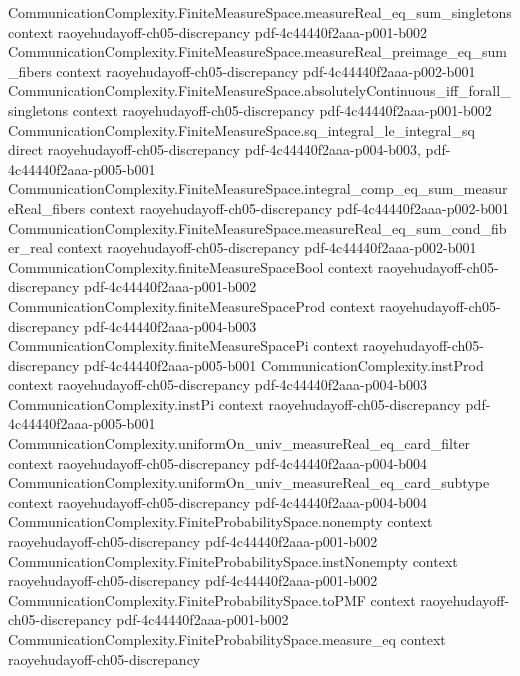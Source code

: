 \begin{theorem}
\proofstep
  {CommunicationComplexity.FiniteMeasureSpace.measureReal_eq_sum_singletons}
  {context}
  {raoyehudayoff-ch05-discrepancy}
  {pdf-4c44440f2aaa-p001-b002}
\proofstep
  {CommunicationComplexity.FiniteMeasureSpace.measureReal_preimage_eq_sum_fibers}
  {context}
  {raoyehudayoff-ch05-discrepancy}
  {pdf-4c44440f2aaa-p002-b001}
\proofstep
  {CommunicationComplexity.FiniteMeasureSpace.absolutelyContinuous_iff_forall_singletons}
  {context}
  {raoyehudayoff-ch05-discrepancy}
  {pdf-4c44440f2aaa-p001-b002}
\proofstep
  {CommunicationComplexity.FiniteMeasureSpace.sq_integral_le_integral_sq}
  {direct}
  {raoyehudayoff-ch05-discrepancy}
  {pdf-4c44440f2aaa-p004-b003,
    pdf-4c44440f2aaa-p005-b001}
\proofstep
  {CommunicationComplexity.FiniteMeasureSpace.integral_comp_eq_sum_measureReal_fibers}
  {context}
  {raoyehudayoff-ch05-discrepancy}
  {pdf-4c44440f2aaa-p002-b001}
\proofstep
  {CommunicationComplexity.FiniteMeasureSpace.measureReal_eq_sum_cond_fiber_real}
  {context}
  {raoyehudayoff-ch05-discrepancy}
  {pdf-4c44440f2aaa-p002-b001}
\proofstep
  {CommunicationComplexity.finiteMeasureSpaceBool}
  {context}
  {raoyehudayoff-ch05-discrepancy}
  {pdf-4c44440f2aaa-p001-b002}
\proofstep
  {CommunicationComplexity.finiteMeasureSpaceProd}
  {context}
  {raoyehudayoff-ch05-discrepancy}
  {pdf-4c44440f2aaa-p004-b003}
\proofstep
  {CommunicationComplexity.finiteMeasureSpacePi}
  {context}
  {raoyehudayoff-ch05-discrepancy}
  {pdf-4c44440f2aaa-p005-b001}
\proofstep
  {CommunicationComplexity.instProd}
  {context}
  {raoyehudayoff-ch05-discrepancy}
  {pdf-4c44440f2aaa-p004-b003}
\proofstep
  {CommunicationComplexity.instPi}
  {context}
  {raoyehudayoff-ch05-discrepancy}
  {pdf-4c44440f2aaa-p005-b001}
\proofstep
  {CommunicationComplexity.uniformOn_univ_measureReal_eq_card_filter}
  {context}
  {raoyehudayoff-ch05-discrepancy}
  {pdf-4c44440f2aaa-p004-b004}
\proofstep
  {CommunicationComplexity.uniformOn_univ_measureReal_eq_card_subtype}
  {context}
  {raoyehudayoff-ch05-discrepancy}
  {pdf-4c44440f2aaa-p004-b004}
\proofstep
  {CommunicationComplexity.FiniteProbabilitySpace.nonempty}
  {context}
  {raoyehudayoff-ch05-discrepancy}
  {pdf-4c44440f2aaa-p001-b002}
\proofstep
  {CommunicationComplexity.FiniteProbabilitySpace.instNonempty}
  {context}
  {raoyehudayoff-ch05-discrepancy}
  {pdf-4c44440f2aaa-p001-b002}
\proofstep
  {CommunicationComplexity.FiniteProbabilitySpace.toPMF}
  {context}
  {raoyehudayoff-ch05-discrepancy}
  {pdf-4c44440f2aaa-p001-b002}
\proofstep
  {CommunicationComplexity.FiniteProbabilitySpace.measure_eq}
  {context}
  {raoyehudayoff-ch05-discrepancy}

\end{theorem}
